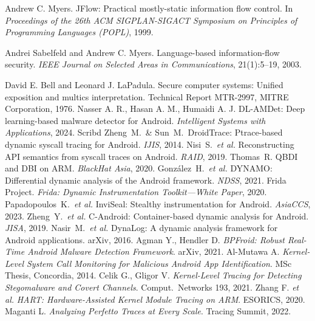 \documentclass[a4paper,12pt]{report}
\begin{document}
\begin{thebibliography}{99}
Andrew C. Myers.
\newblock JFlow: Practical mostly-static information flow control.
\newblock In \emph{Proceedings of the 26th ACM SIGPLAN-SIGACT Symposium on Principles of Programming Languages (POPL)}, 1999.

Andrei Sabelfeld and Andrew C. Myers.
\newblock Language-based information-flow security.
\newblock \emph{IEEE Journal on Selected Areas in Communications}, 21(1):5–19, 2003.

David E. Bell and Leonard J. LaPadula.
\newblock Secure computer systems: Unified exposition and multics interpretation.
\newblock Technical Report MTR-2997, MITRE Corporation, 1976.
    Nasser A. R., Hasan A. M., Humaidi A. J. DL-AMDet: Deep learning-based malware detector for Android. \textit{Intelligent Systems with Applications}, 2024. Scribd
     Zheng~M.\ \& Sun~M.\ DroidTrace: Ptrace-based dynamic syscall tracing for Android. \textit{IJIS}, 2014.
     Nisi~S.\ \emph{et al.} Reconstructing API semantics from syscall traces on Android. \textit{RAID}, 2019.
     Thomas~R. QBDI and DBI on ARM. \textit{BlackHat Asia}, 2020.
     González~H.\ \emph{et al.} DYNAMO: Differential dynamic analysis of the Android framework. \textit{NDSS}, 2021.
     Frida Project. \textit{Frida: Dynamic Instrumentation Toolkit—White Paper}, 2020.
     Papadopoulos~K.\ \emph{et al.} InviSeal: Stealthy instrumentation for Android. \textit{AsiaCCS}, 2023.
     Zheng~Y.\ \emph{et al.} C-Android: Container-based dynamic analysis for Android. \textit{JISA}, 2019.
     Nasir~M.\ \emph{et al.} DynaLog: A dynamic analysis framework for Android applications. arXiv, 2016.
     Agman Y., Hendler D. \emph{BPFroid: Robust Real-Time Android Malware Detection Framework}. arXiv, 2021.
     Al-Mutawa A. \emph{Kernel-Level System Call Monitoring for Malicious Android App Identification}. MSc Thesis, Concordia, 2014.
     Celik G., Gligor V. \emph{Kernel-Level Tracing for Detecting Stegomalware and Covert Channels}. Comput.\ Networks 193, 2021.
     Zhang F. \emph{et al.} \emph{HART: Hardware-Assisted Kernel Module Tracing on ARM}. ESORICS, 2020.
     Maganti L. \emph{Analyzing Perfetto Traces at Every Scale}. Tracing Summit, 2022.

\end{thebibliography}
\end{document}
